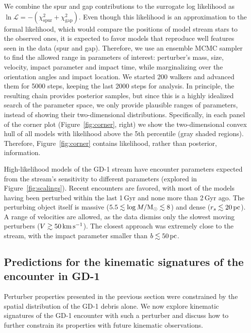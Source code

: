 \documentclass[twocolumn]{aastex62}
\begin{document}
We combine the spur and gap contributions to the surrogate log likelihood as $\ln\mathcal{L} = -(\chi^2_\mathrm{spur} + \chi^2_\mathrm{gap})$.
Even though this likelihood is an approximation to the formal likelihood, which would compare the positions of model stream stars to the observed ones, it is expected to favor models that reproduce well features seen in the data (spur and gap).
Therefore, we use an ensemble MCMC sampler \citep{Foreman-Mackey:2013} to find the allowed range in parameters of interest: perturber's mass, size, velocity, impact parameter and impact time, while marginalizing over the orientation angles and impact location.
We started 200 walkers and advanced them for 5000 steps, keeping the last 2000 steps for analysis.
In principle, the resulting chain provides posterior samples, but since this is a highly idealized search of the parameter space, we only provide plausible ranges of parameters, instead of showing their two-dimensional distributions.
Specifically, in each panel of the corner plot (Figure~\ref{fig:corner}, right) we show the two-dimensional convex hull of all models with likelihood above the 5th percentile (gray shaded regions).
Therefore, Figure~\ref{fig:corner} contains likelihood, rather than posterior, information.

High-likelihood models of the GD-1 stream have encounter parameters expected from the stream's sensitivity to different parameters (explored in Figure~\ref{fig:scalings}).
Recent encounters are favored, with most of the models having been perturbed within the last 1\,Gyr and none more than 2\,Gyr ago.
The perturbing object itself is massive ($5.5\lesssim\log M/\rm M_\odot\lesssim8$) and dense ($r_s\lesssim20\,\rm pc$).
A range of velocities are allowed, as the data dismiss only the slowest moving perturbers ($V\gtrsim50\,\rm km\,s^{-1}$).
The closest approach was extremely close to the stream, with the impact parameter smaller than $b\lesssim50\rm\,pc$.


\subsection{Predictions for the kinematic signatures of the encounter in GD-1}
\label{sec:kinematics}
Perturber properties presented in the previous section were constrained by the spatial distribution of the GD-1 debris alone.
We now explore kinematic signatures of the GD-1 encounter with such a perturber and discuss how to further constrain its properties with future kinematic observations.
\end{document}
